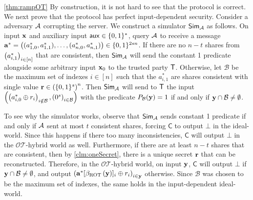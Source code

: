 \documentclass{llncs}
\newcommand{\OTfunc}{\mathcal{OT}}
\newcommand{\OThybrid}{\OTfunc\mbox{-}\text{hybrid}}
\newcommand{\ROT}{\operatorname{ROT}}
\renewcommand{\B}{\mathcal{B}}
\renewcommand{\a}{\myvec{a}}
\newcommand{\x}{\myvec{x}}
\newcommand{\y}{\myvec{y}}
\newcommand{\aux}{\mathsf{aux}}
\newcommand{\clnt}{\beta}
\newcommand{\Cc}{\mathsf{C}}
\begin{document}
\begin{proofof}{\cref{thm:rampOT}}
By construction, it is not hard to see that the protocol is correct. We next prove that the protocol has perfect input-dependent security. Consider a adversary $\mathcal{A}$ corrupting the server. We construct a simulator $\mathsf{Sim}_{\mathcal{A}}$ as follows. On input $\x$ and auxiliary input $\aux\in\zo^*$, query $\mathcal{A}$ to receive a message $\a^*=\vect{(a^*_{1,0},a^*_{1,1}),\ldots,(a^*_{n,0},a^*_{n,1})}\in\zo^{2sn}$. If there are no $n-t$ shares from $\left ( a^*_{i,1} \right )_{i\in[n]}$ that are consistent, then $\mathsf{Sim}_{\mathcal{A}}$ will send the constant 1 predicate alongside some arbitrary input $\x_0$ to the trusted party $\mathsf{T}$. Otherwise, let $\B$ be the maximum set of indexes $i\in[n]$ such that the $a^*_{i,1}$ are shares consistent with single value ${\bf r}\in\left(\{0,1\}^s\right)^n$. Then $\mathsf{Sim}_{\mathcal{A}}$ will send to $\mathsf{T}$ the input $\left(\vect{a^*_{i,0}\xor r_i}_{i\notin\B},\vect{0^s}_{i\in\B}\right)$ with the predicate $P_\B(\y)=1$ if and only if $\y\cap\B\ne\emptyset$.

To see why the simulator works, observe that $\mathsf{Sim}_{\mathcal{A}}$ sends constant 1 predicate if and only if $\mathcal{A}$ sent at most $t$ consistent shares, forcing $\Cc$ to output $\bot$ in the ideal-world. Since this happens if there too many inconsistencies, $\Cc$ will output $\bot$ in the $\OThybrid$ world as well. Furthermore, if there are at least $n-t$ shares that are consistent, then by \cref{clm:oneSecret}, there is a unique secret ${\bf r}$ that can be reconstructed. Therefore, in the $\OThybrid$ world, on input $\y$, $\Cc$ will output $\bot$ if $\y\cap\B\ne\emptyset$, and output $\vect{\a^*[\clnt_{\ROT}\of{\y}]_i\xor r_i}_{i\in\y}$ otherwise. Since $\B$ was chosen to be the maximum set of indexes, the same holds in the input-dependent ideal-world.




\end{proofof}
\end{document}
